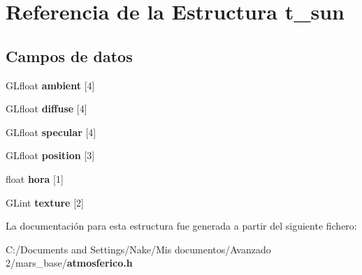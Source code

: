 \section{Referencia de la Estructura t\_\-sun}
\label{structt__sun}
\subsection*{Campos de datos}
\begin{DoxyCompactItemize}
\item 
GLfloat {\bfseries ambient} [4]\label{structt__sun_a06833ed5cacd5df6bbaca06aaae76351}

\item 
GLfloat {\bfseries diffuse} [4]\label{structt__sun_a98b71067a69a63e35816188857acd3be}

\item 
GLfloat {\bfseries specular} [4]\label{structt__sun_a600ea59cda5d0bb3812fc6787287728c}

\item 
GLfloat {\bfseries position} [3]\label{structt__sun_a0b230fb96d8ac7118f5b81e9c4665f03}

\item 
float {\bfseries hora} [1]\label{structt__sun_a75d8e4a3735a69673d7c57560ffcd02d}

\item 
GLint {\bfseries texture} [2]\label{structt__sun_aa147b258ec247111609ae4026ef17b75}

\end{DoxyCompactItemize}


La documentación para esta estructura fue generada a partir del siguiente fichero:\begin{DoxyCompactItemize}
\item 
C:/Documents and Settings/Nake/Mis documentos/Avanzado 2/mars\_\-base/{\bf atmosferico.h}\end{DoxyCompactItemize}

